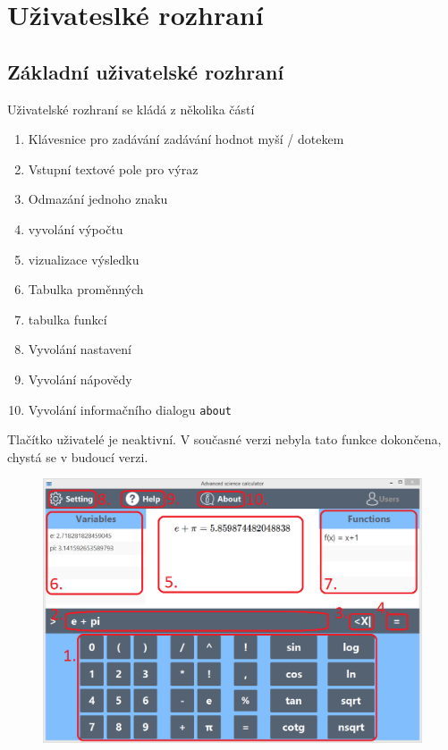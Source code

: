 \documentclass[11pt, a4paper, titlepage]{article}
\begin{document}
	\section{Uživateslké rozhraní}

	\subsection{Základní uživatelské rozhraní}

	Uživatelské rozhraní se kládá z několika částí

	\begin{enumerate}
		\item Klávesnice pro zadávání zadávání hodnot myší / dotekem
		\item Vstupní textové pole pro výraz
		\item Odmazání jednoho znaku
		\item vyvolání výpočtu
		\item vizualizace výsledku
		\item Tabulka proměnných
		\item tabulka funkcí
		\item Vyvolání nastavení
		\item Vyvolání nápovědy
		\item Vyvolání informačního dialogu \texttt{about}
	\end{enumerate}

	Tlačítko uživatelé je neaktivní. V současné verzi nebyla tato funkce dokončena, chystá se v budoucí verzi.

	\begin{figure}[t!]
	    \centering
	    \includegraphics[scale=0.5]{./assets/rozhr.png}
	\end{figure}
\end{document}
